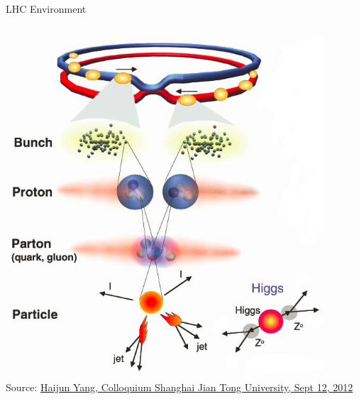 \begin{frame}{LHC Environment}
\begin{columns}
\begin{column}{0.5\textwidth}
\begin{center}
\includegraphics[width=0.89\textwidth]{images/HKrT0L.png}\\
{\fontsize{.1cm}{.001em}\selectfont Source: \url{Haijun Yang, Colloquium Shanghai Jian Tong University, Sept 12, 2012}}
\end{center}
\end{column}
\end{columns}
%
\end{frame}


